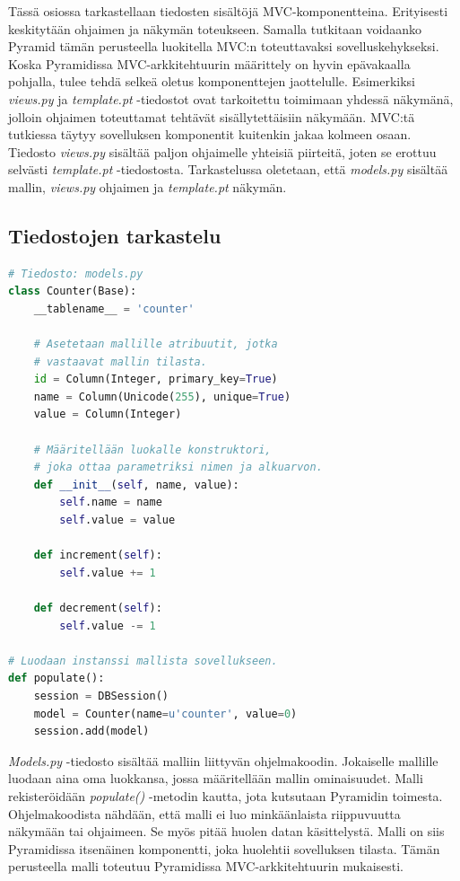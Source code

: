 \documentclass[finnish,utf8,nonumbib,palatino,kandi]{gradu2}
\begin{document}
Tässä osiossa tarkastellaan tiedosten sisältöjä MVC-komponentteina. Erityisesti keskitytään ohjaimen ja näkymän toteukseen. Samalla tutkitaan voidaanko Pyramid tämän perusteella luokitella MVC:n toteuttavaksi sovelluskehykseksi.
Koska Pyramidissa MVC-arkkitehtuurin määrittely on hyvin epävakaalla pohjalla, tulee tehdä selkeä oletus komponenttejen jaottelulle. Esimerkiksi \emph{views.py} ja \emph{template.pt} -tiedostot ovat tarkoitettu toimimaan yhdessä näkymänä, jolloin ohjaimen toteuttamat tehtävät sisällytettäisiin näkymään. MVC:tä tutkiessa täytyy sovelluksen komponentit kuitenkin jakaa kolmeen osaan.  Tiedosto \emph{views.py}
sisältää paljon ohjaimelle yhteisiä piirteitä, joten se erottuu selvästi \emph{template.pt} -tiedostosta. Tarkastelussa oletetaan, että  \emph{models.py} sisältää mallin, \emph{views.py} ohjaimen ja \emph{template.pt} näkymän.

\subsection{Tiedostojen tarkastelu}
\lstset{numbers=left}
\begin{lstlisting}[language=Python]
# Tiedosto: models.py
class Counter(Base):
    __tablename__ = 'counter'

    # Asetetaan mallille atribuutit, jotka
    # vastaavat mallin tilasta.
    id = Column(Integer, primary_key=True)
    name = Column(Unicode(255), unique=True)
    value = Column(Integer)

    # Määritellään luokalle konstruktori,
    # joka ottaa parametriksi nimen ja alkuarvon.
    def __init__(self, name, value):
        self.name = name
        self.value = value

    def increment(self):
        self.value += 1

    def decrement(self):
        self.value -= 1

# Luodaan instanssi mallista sovellukseen.
def populate():
    session = DBSession()
    model = Counter(name=u'counter', value=0)
    session.add(model)
\end{lstlisting}

\emph{Models.py} -tiedosto sisältää malliin liittyvän ohjelmakoodin. Jokaiselle mallille luodaan aina oma luokkansa, jossa määritellään mallin ominaisuudet. Malli rekisteröidään \emph{populate()} -metodin kautta, jota kutsutaan Pyramidin toimesta.
Ohjelmakoodista nähdään, että malli ei luo minkäänlaista riippuvuutta näkymään tai ohjaimeen. Se myös pitää huolen datan käsittelystä.  Malli on siis Pyramidissa itsenäinen komponentti, joka huolehtii sovelluksen tilasta. Tämän perusteella malli toteutuu Pyramidissa MVC-arkkitehtuurin mukaisesti. \\
\end{document}

